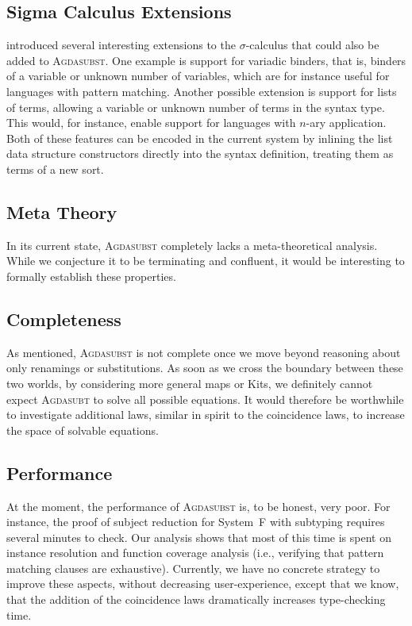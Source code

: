 \documentclass[screen,nonacm]{acmart}
\begin{document}
\subsection*{Sigma Calculus Extensions}
\citeauthor{Stark:2020:Mechanising} introduced several interesting extensions to the $\sigma$-calculus that could
also be added to \textsc{Agdasubst}. One example is support for variadic binders,
that is, binders of a variable or unknown number of variables, which are for instance useful for languages with
pattern matching. Another possible extension is support for lists of terms, allowing a variable or
unknown number of terms in the syntax type. This would, for instance, enable support for
languages with $n$-ary application.
Both of these features can be encoded in the current system by inlining the list data structure constructors
directly into the syntax definition, treating them as terms of a new sort.

\subsection*{Meta Theory}
In its current state, \textsc{Agdasubst} completely lacks a meta-theoretical
analysis. While we conjecture it to be terminating and confluent, it would be
interesting to formally establish these properties.

\subsection*{Completeness}
As mentioned, \textsc{Agdasubst} is not complete once we move beyond reasoning
about only renamings or substitutions. As soon as we cross the boundary between
these two worlds, by considering more general maps or Kits, we definitely
cannot expect \textsc{Agdasubt} to solve all possible equations. It would
therefore be worthwhile to investigate additional laws, similar in spirit to
the coincidence laws, to increase the space of solvable equations.

\subsection*{Performance}
At the moment, the performance of \textsc{Agdasubst} is, to be honest, very
poor. For instance, the proof of subject reduction for System~F with subtyping
requires several minutes to check. Our analysis shows that most of this time is
spent on instance resolution and function coverage analysis (i.e., verifying
that pattern matching clauses are exhaustive). Currently, we have no concrete
strategy to improve these aspects, without decreasing user-experience, except
that we know, that the addition of the coincidence laws dramatically increases
type-checking time.
\end{document}
